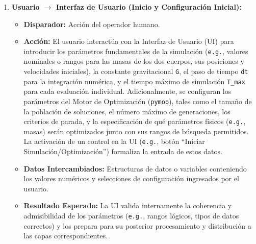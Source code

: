 \begin{enumerate}
    \item \textbf{Usuario $\rightarrow$ Interfaz de Usuario (Inicio y Configuración Inicial):}
    \begin{itemize}
        \item \textbf{Disparador:} Acción del operador humano.
        \item \textbf{Acción:} El usuario interactúa con la Interfaz de Usuario (UI) para introducir los parámetros fundamentales de la simulación (\texttt{e.g.}, valores nominales o rangos para las masas de los dos cuerpos, sus posiciones y velocidades iniciales), la constante gravitacional \texttt{G}, el paso de tiempo \texttt{dt} para la integración numérica, y el tiempo máximo de simulación \texttt{T\_max} para cada evaluación individual. Adicionalmente, se configuran los parámetros del Motor de Optimización (\texttt{pymoo}), tales como el tamaño de la población de soluciones, el número máximo de generaciones, los criterios de parada, y la especificación de qué parámetros físicos (\texttt{e.g.}, masas) serán optimizados junto con sus rangos de búsqueda permitidos. La activación de un control en la UI (\texttt{e.g.}, botón ``Iniciar Simulación/Optimización'') formaliza la entrada de estos datos.
        \item \textbf{Datos Intercambiados:} Estructuras de datos o variables conteniendo los valores numéricos y selecciones de configuración ingresados por el usuario.
        \item \textbf{Resultado Esperado:} La UI valida internamente la coherencia y admisibilidad de los parámetros (\texttt{e.g.}, rangos lógicos, tipos de datos correctos) y los prepara para su posterior procesamiento y distribución a las capas correspondientes.
    \end{itemize}


\end{enumerate}
